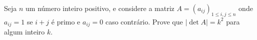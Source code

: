 Seja \( n\) um número inteiro positivo, e considere a matriz \( A = (a_{ij})_{1\leq i,j\leq n}\) onde \( a_{ij} = 1\) se \( i+j\) é primo e \( a_{ij} = 0\) caso contrário. Prove que \( |\det A| = k^2\) para algum inteiro \( k\).
